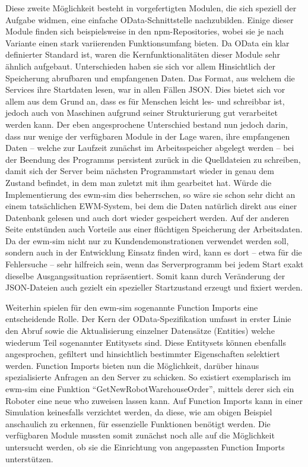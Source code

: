 Diese zweite Möglichkeit besteht in vorgefertigten Modulen, die sich speziell der Aufgabe widmen, eine einfache OData-Schnittstelle nachzubilden.
Einige dieser Module finden sich beispielsweise in den \ac{npm}-Repositories, wobei sie je nach Variante einen stark variierenden Funktionsumfang bieten.
Da OData ein klar definierter Standard ist, waren die Kernfunktionalitäten dieser Module sehr ähnlich aufgebaut.
Unterschieden haben sie sich vor allem Hinsichtlich der Speicherung abrufbaren und empfangenen Daten.
Das Format, aus welchem die Services ihre Startdaten lesen, war in allen Fällen \ac{JSON}.
Dies bietet sich vor allem aus dem Grund an, dass es für Menschen leicht les- und schreibbar ist, jedoch auch von Maschinen aufgrund seiner Strukturierung gut verarbeitet werden kann.
Der eben angesprochene Unterschied bestand nun jedoch darin, dass nur wenige der verfügbaren Module in der Lage waren, ihre empfangenen Daten -- welche zur Laufzeit zunächst im Arbeitsspeicher abgelegt werden -- bei der Beendung des Programms persistent zurück in die Quelldateien zu schreiben, damit sich der Server beim nächsten Programmstart wieder in genau dem Zustand befindet, in dem man zuletzt mit ihm gearbeitet hat.
Würde die Implementierung des \ac{ewm-sim} dies beherrschen, so wäre sie schon sehr dicht an einem tatsächlichen \ac{EWM}-System, bei dem die Daten natürlich direkt aus einer Datenbank gelesen und auch dort wieder gespeichert werden.
Auf der anderen Seite entstünden auch Vorteile aus einer flüchtigen Speicherung der Arbeitsdaten.
Da der \ac{ewm-sim} nicht nur zu Kundendemonstrationen verwendet werden soll, sondern auch in der Entwicklung Einsatz finden wird, kann es dort -- etwa für die Fehlersuche -- sehr hilfreich sein, wenn das Serverprogramm bei jedem Start exakt dieselbe Ausgangssituation repräsentiert.
Somit kann durch Veränderung der \ac{JSON}-Dateien auch gezielt ein spezieller Startzustand erzeugt und fixiert werden.

Weiterhin spielen für den \ac{ewm-sim} sogenannte Function Imports eine entscheidende Rolle.
Der Kern der OData-Spezifikation umfasst in erster Linie den Abruf sowie die Aktualisierung einzelner Datensätze (Entities) welche wiederum Teil sogenannter Entitysets sind.
Diese Entitysets können ebenfalls angesprochen, gefiltert und hinsichtlich bestimmter Eigenschaften selektiert werden.
Function Imports bieten nun die Möglichkeit, darüber hinaus spezialisierte Anfragen an den Server zu schicken.
So existiert exemplarisch im \ac{ewm-sim} eine Funktion \enquote{GetNewRobotWarehouseOrder}, mittels derer sich ein Roboter eine neue \ac{who} zuweisen lassen kann.
Auf Function Imports kann in einer Simulation keinesfalls verzichtet werden, da diese, wie am obigen Beispiel anschaulich zu erkennen, für essenzielle Funktionen benötigt werden.
Die verfügbaren Module mussten somit zunächst noch alle auf die Möglichkeit untersucht werden, ob sie die Einrichtung von angepassten Function Imports unterstützen.

